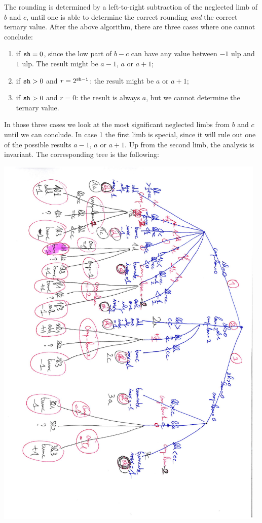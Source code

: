 \documentclass[12pt]{amsart}
\begin{document}
The rounding is determined by a left-to-right subtraction of the neglected
limb of $b$ and $c$, until one is able to determine the correct rounding
\emph{and} the correct ternary value.
After the above algorithm, there are three cases where one cannot conclude:
\begin{enumerate}
\item if ${\tt sh} = 0$, since the low part of $b-c$ can have any value
      between $-1$ ulp and $1$ ulp. The result might be $a-1$, $a$ or $a+1$;
\item if ${\tt sh} > 0$ and $r = 2^{\tt sh - 1}$: the result might be
      $a$ or $a+1$;
\item if ${\tt sh} > 0$ and $r = 0$: the result is always $a$, but we cannot
      determine the ternary value.
\end{enumerate}
In those three cases we look at the most significant neglected limbs from
$b$ and $c$ until we can conclude.
In case 1 the first limb is special, since it will rule out one of the
possible results $a-1$, $a$ or $a+1$.
Up from the second limb, the analysis is invariant.
The corresponding tree is the following:

\centerline{\includegraphics[width=13cm,angle=90]{sub_tree.pdf}}
\end{document}
